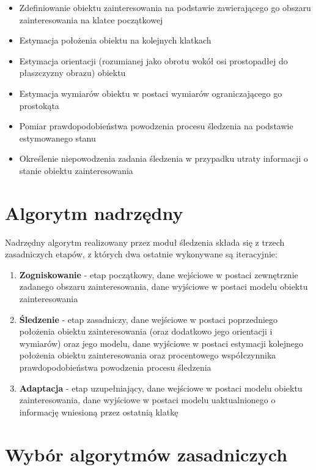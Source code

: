 \begin{itemize}

	\item Zdefiniowanie obiektu zainteresowania na podstawie zawierającego go obszaru zainteresowania na klatce początkowej
	\item Estymacja położenia obiektu na kolejnych klatkach
	\item Estymacja orientacji (rozumianej jako obrotu wokół osi prostopadłej do płaszczyzny obrazu) obiektu
	\item Estymacja wymiarów obiektu w postaci wymiarów ograniczającego go prostokąta
	\item Pomiar prawdopodobieństwa powodzenia procesu śledzenia na podstawie estymowanego stanu
	\item Określenie niepowodzenia zadania śledzenia w przypadku utraty informacji o stanie obiektu zainteresowania

\end{itemize}

\section{Algorytm nadrzędny}
\label{sec:Algorytm_nadrzedny}

Nadrzędny algorytm realizowany przez moduł śledzenia składa się z trzech zasadniczych etapów, z których dwa ostatnie wykonywane są iteracyjnie:

\begin{enumerate}

	\item \textbf{Zogniskowanie} - etap początkowy, dane wejściowe w postaci zewnętrznie zadanego obszaru zainteresowania, dane wyjściowe w postaci modelu obiektu zainteresowania
	\item \textbf{Śledzenie} - etap zasadniczy, dane wejściowe w postaci poprzedniego położenia obiektu zainteresowania (oraz dodatkowo jego orientacji i wymiarów) oraz jego modelu, dane wyjściowe w postaci estymacji kolejnego położenia obiektu zainteresowania oraz procentowego współczynnika prawdopodobieństwa powodzenia procesu śledzenia
	\item \textbf{Adaptacja} - etap uzupełniający, dane wejściowe w postaci modelu obiektu zainteresowania, dane wyjściowe w postaci modelu uaktualnionego o informację wniesioną przez ostatnią klatkę

\end{enumerate}

\section{Wybór algorytmów zasadniczych}
\label{sec:Wybor_algorytmow_zasadniczych}

